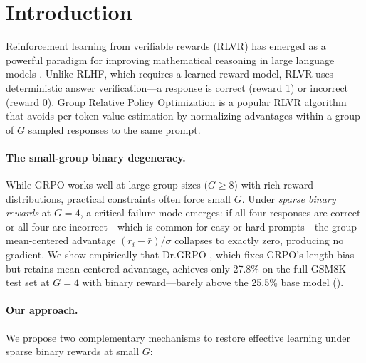 \section{Introduction}
\label{sec:intro}

Reinforcement learning from verifiable rewards (RLVR) has emerged as a powerful paradigm for improving mathematical reasoning in large language models \citep{shao2024deepseekmath, guo2025deepseek}.
Unlike RLHF, which requires a learned reward model, RLVR uses deterministic answer verification---a response is correct (reward 1) or incorrect (reward 0).
Group Relative Policy Optimization \citep[GRPO;][]{shao2024deepseekmath} is a popular RLVR algorithm that avoids per-token value estimation by normalizing advantages within a group of $G$ sampled responses to the same prompt.

\paragraph{The small-group binary degeneracy.}
While GRPO works well at large group sizes ($G \geq 8$) with rich reward distributions, practical constraints often force small $G$.
Under \emph{sparse binary rewards} at $G{=}4$, a critical failure mode emerges: if all four responses are correct or all four are incorrect---which is common for easy or hard prompts---the group-mean-centered advantage $(r_i - \bar{r}) / \sigma$ collapses to exactly zero, producing no gradient.
We show empirically that Dr.GRPO \citep{liu2025understanding}, which fixes GRPO's length bias but retains mean-centered advantage, achieves only 27.8\% on the full GSM8K test set at $G{=}4$ with binary reward---barely above the 25.5\% base model ().

\paragraph{Our approach.}
We propose two complementary mechanisms to restore effective learning under sparse binary rewards at small $G$:

